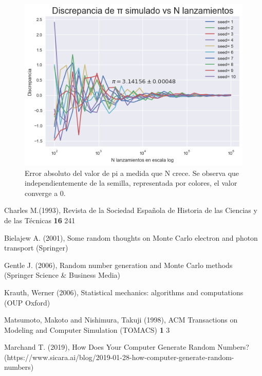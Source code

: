 \documentclass{rbf}
\begin{document}
\begin{figure}[tp]
  \includegraphics[scale=0.5]{figures/errors.png}
	\caption{Error absoluto del valor de pi a medida que N crece. Se observa que independientemente de la semilla, representada por colores, el valor converge a 0.}
 \label{buff4}
\end{figure}

\begin{thebibliography}

Charles M.(1993), Revista de la Sociedad Espa{\~n}ola de Historia de las Ciencias y de las T{\'e}cnicas {\bf 16} 241

Bielajew A. (2001), Some random thoughts on Monte Carlo electron and photon transport (Springer)

Gentle J. (2006), Random number generation and Monte Carlo methods (Springer Science \& Business Media)

Krauth, Werner (2006), Statistical mechanics: algorithms and computations (OUP Oxford)

Matsumoto, Makoto and Nishimura, Takuji (1998), ACM Transactions on Modeling and Computer Simulation (TOMACS) {\bf 1} 3

Marchand T. (2019), How Does Your Computer Generate Random Numbers? (https://www.sicara.ai/blog/2019-01-28-how-computer-generate-random-numbers)

\end{thebibliography}
\end{document}
